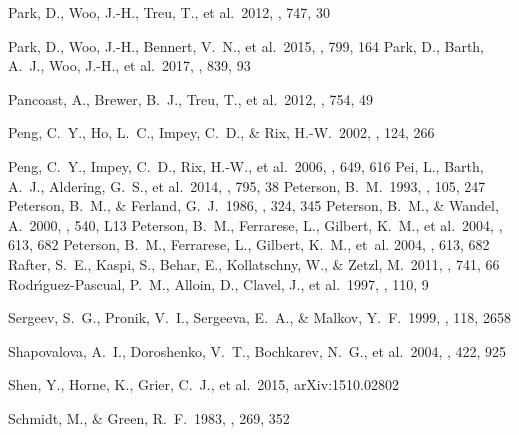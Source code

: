 \documentclass[iop]{emulateapj}
\begin{document}
\begin{thebibliography}{63}
 Park, D., Woo, J.-H., Treu, T., et al.\ 2012, \apj, 747, 30 

 Park, D., Woo, J.-H., Bennert, V.~N., et al.\ 2015, \apj, 799, 164 
 Park, D., Barth, A.~J., Woo, J.-H., et al.\ 2017, \apj, 839, 93 

 Pancoast, A., Brewer, 
B.~J., Treu, T., et al.\ 2012, \apj, 754, 49 

 Peng, C.~Y., Ho, L.~C., Impey, C.~D., \& Rix, H.-W.\ 2002, \aj, 124, 266 

 Peng, C.~Y., Impey, C.~D., 
Rix, H.-W., et al.\ 2006, \apj, 649, 616
 Pei, L., Barth, A.~J., 
Aldering, G.~S., et al.\ 2014, \apj, 795, 38  
 Peterson, B.~M.\ 1993, \pasp, 105, 247 
 Peterson, B.~M., \& Ferland, G.~J.\ 1986, \nat, 324, 345 
 Peterson, B.~M., \& Wandel, A.\ 2000, \apjl, 540, L13 
 Peterson, B.~M., 
Ferrarese, L., Gilbert, K.~M., et al.\ 2004, \apj, 613, 682
{Peterson}, B.~M., {Ferrarese}, L., {Gilbert}, K.~M., {et~al.} 2004, \apj, 613,  682
 Rafter, S.~E., Kaspi, 
S., Behar, E., Kollatschny, W., \& Zetzl, M.\ 2011, \apj, 741, 66 
Rodr{\'{\i}}guez-Pascual, P.~M., Alloin, D., Clavel, J., et al.\ 1997, 
\apjs, 110, 9 

 Sergeev, S.~G., Pronik, V.~I., Sergeeva, E.~A., \& Malkov, Y.~F.\ 1999, \aj, 118, 2658 

 Shapovalova, A.~I., Doroshenko, V.~T., Bochkarev, N.~G., et al.\ 2004, \aap, 422, 925 

 Shen, Y., Horne, K., 
Grier, C.~J., et al.\ 2015, arXiv:1510.02802 

 Schmidt, M., \& Green, R.~F.\ 1983, \apj, 269, 352 



\end{thebibliography}
\end{document}
